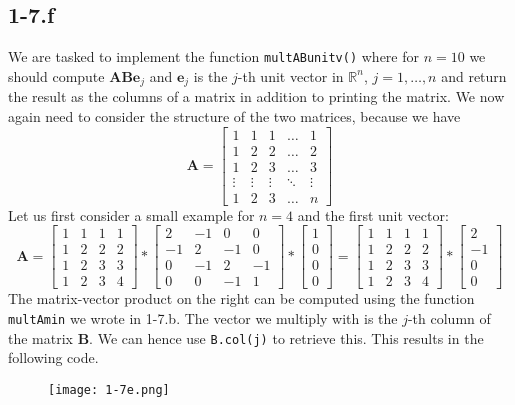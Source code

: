 \documentclass{article}
\begin{document}
\subsection*{1-7.f} 
We are tasked to implement the function \verb|multABunitv()| where for $n=10$ we should compute $\mathbf{A}\mathbf{B}\mathbf{e}_{j}$ and $\mathbf{e}_{j}$ is the $j$-th unit vector in $\mathbb{R}^{n}$, $j = 1, \dots, n$ and return the result as the columns of a matrix in addition to printing the matrix. We now again need to consider the structure of the two matrices, because we have
\begin{equation*}
    \mathbf{A} = \begin{bmatrix}
        1 & 1 & 1 & \dots & 1 \\
        1 & 2 & 2 & \dots & 2 \\
        1 & 2 & 3 & \dots & 3 \\
        \vdots & \vdots & \vdots &\ddots & \vdots \\
        1 & 2 & 3 & \dots & n
    \end{bmatrix}
\end{equation*}
Let us first consider a small example for $n = 4$ and the first unit vector:
\begin{equation*}
    \mathbf{A} = \begin{bmatrix}
        1 & 1 & 1 & 1 \\
        1 & 2 & 2 & 2 \\
        1 & 2 & 3 & 3 \\
        1 & 2 & 3 & 4
    \end{bmatrix}
    *
    \begin{bmatrix}
        2 & -1 & 0 & 0 \\
        -1 & 2 & -1 & 0 \\
        0 & -1 & 2 & -1 \\
        0 & 0 & -1 & 1
    \end{bmatrix}
    *
    \begin{bmatrix}
        1 \\0 \\0 \\0
    \end{bmatrix}
    = 
    \begin{bmatrix}
        1 & 1 & 1 & 1 \\
        1 & 2 & 2 & 2 \\
        1 & 2 & 3 & 3 \\
        1 & 2 & 3 & 4
    \end{bmatrix}
    * \begin{bmatrix}
        2 \\ -1 \\ 0 \\ 0
    \end{bmatrix}
\end{equation*}
The matrix-vector product on the right can be computed using the function \verb|multAmin| we wrote in 1-7.b. The vector we multiply with is the $j$-th column of the matrix $\mathbf{B}$. We can hence use \verb|B.col(j)| to retrieve this. This results in the following code. 

\begin{figure}[!hbt]
    \centering
\texttt{[image: 1-7e.png]}
\end{figure}
\end{document}
